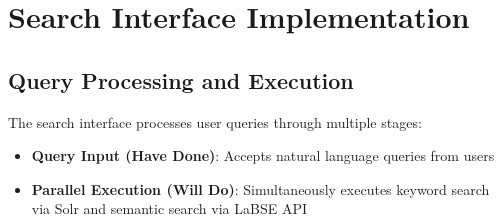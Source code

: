 \documentclass[11pt,a4paper]{article}
\begin{document}
\section{Search Interface Implementation}

\subsection{Query Processing and Execution}
The search interface processes user queries through multiple stages:
\begin{itemize}[leftmargin=*,nosep]
    \item \textbf{Query Input (Have Done)}: Accepts natural language queries from users
    \item \textbf{Parallel Execution (Will Do)}: Simultaneously executes keyword search via Solr and semantic search via LaBSE API
\end{itemize}
\end{document}
